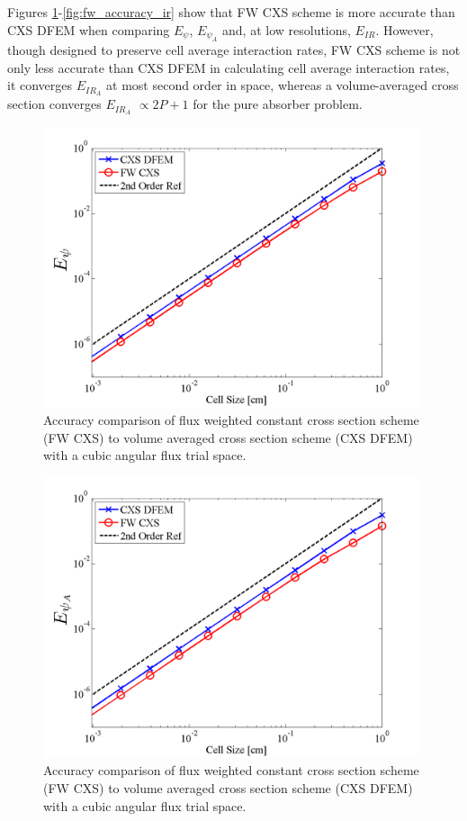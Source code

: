 Figures \ref{fig:fw_accuracy_psi}-\ref{fig:fw_accuracy_ir} show that FW CXS scheme is more accurate than CXS DFEM when comparing $E_{\psi}$, $E_{\psi_A}$ and, at low resolutions, $E_{IR}$.
However, though designed to preserve cell average interaction rates, FW CXS scheme is not only less accurate than  CXS DFEM in calculating cell average interaction rates, it converges $E_{IR_A}$ at most second order in space, whereas a volume-averaged cross section converges $E_{IR_A}$ $\propto 2P+1$ for the pure absorber problem.
\vfill{}
%
%
\begin{figure}[!htp]
\centering
\includegraphics[width=11cm]{chapter3_variable_xs/FW_XS_P3_VarXS_E_psi_L2.png}
\caption{Accuracy comparison of flux weighted constant cross section scheme (FW CXS) to volume averaged cross section  scheme (CXS DFEM) with a cubic angular flux trial space.}
\label{fig:fw_accuracy_psi}
\end{figure}
%
%
\begin{figure}[!hbp]
\centering
\includegraphics[width=11cm]{chapter3_variable_xs/FW_XS_P3_VarXS_E_psi_A.png}
\caption{Accuracy comparison of flux weighted constant cross section scheme (FW CXS) to volume averaged cross section  scheme (CXS DFEM) with a cubic angular flux trial space.}
\label{fig:fw_accuracy_psi_a}
\end{figure}
